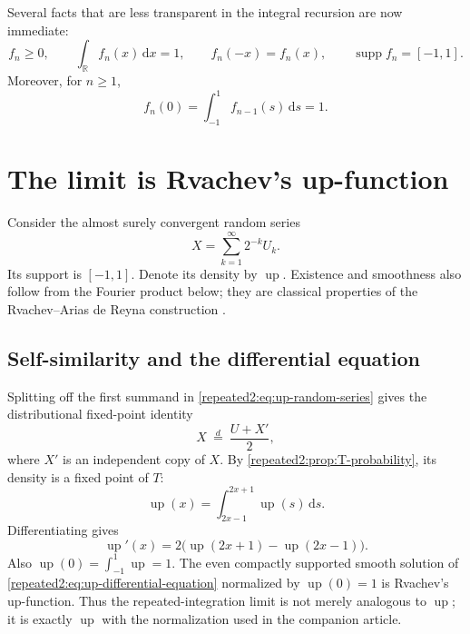 \documentclass[11pt,oneside]{article}
\theoremstyle{definition}
\theoremstyle{remark}
\newcommand{\R}{\mathbb R}
\newcommand{\Up}{\operatorname{up}}
\newcommand{\dd}{\,\mathrm d}
\newcommand{\supp}{\operatorname{supp}}
\begin{document}
Several facts that are less transparent in the integral recursion are now immediate:
\begin{equation}
 f_n\ge0,
 \qquad \int_{\R}f_n(x)\dd x=1,
 \qquad f_n(-x)=f_n(x),
 \qquad \supp f_n=[-1,1].
 \label{repeated2:eq:basic-fn-properties}
\end{equation}
Moreover, for $n\ge1$,
\begin{equation}
 f_n(0)=\int_{-1}^{1}f_{n-1}(s)\dd s=1.
 \label{repeated2:eq:fn-zero-one}
\end{equation}

\section{The limit is Rvachev's up-function}
\label{repeated2:sec:limit-identification}

Consider the almost surely convergent random series
\begin{equation}
 X=\sum_{k=1}^{\infty}2^{-k}U_k.
 \label{repeated2:eq:up-random-series}
\end{equation}
Its support is $[-1,1]$.  Denote its density by $\Up$.  Existence and smoothness also follow
from the Fourier product below; they are classical properties of the Rvachev--Arias de
Reyna construction \cite{repeated2:arias1982}.

\subsection{Self-similarity and the differential equation}

Splitting off the first summand in \eqref{repeated2:eq:up-random-series} gives the distributional
fixed-point identity
\begin{equation}
 X\ \stackrel{d}{=}\ \frac{U+X'}2,
 \label{repeated2:eq:up-fixed-point-random}
\end{equation}
where $X'$ is an independent copy of $X$.  By \cref{repeated2:prop:T-probability}, its density is a
fixed point of $T$:
\begin{equation}
 \Up(x)=\int_{2x-1}^{2x+1}\Up(s)\dd s.
 \label{repeated2:eq:up-fixed-point-integral}
\end{equation}
Differentiating gives
\begin{equation}
 \Up'(x)=2\bigl(\Up(2x+1)-\Up(2x-1)\bigr).
 \label{repeated2:eq:up-differential-equation}
\end{equation}
Also $\Up(0)=\int_{-1}^{1}\Up=1$.  The even compactly supported smooth solution of
\eqref{repeated2:eq:up-differential-equation} normalized by $\Up(0)=1$ is Rvachev's up-function.
Thus the repeated-integration limit is not merely analogous to $\Up$; it is exactly $\Up$
with the normalization used in the companion article.
\end{document}
